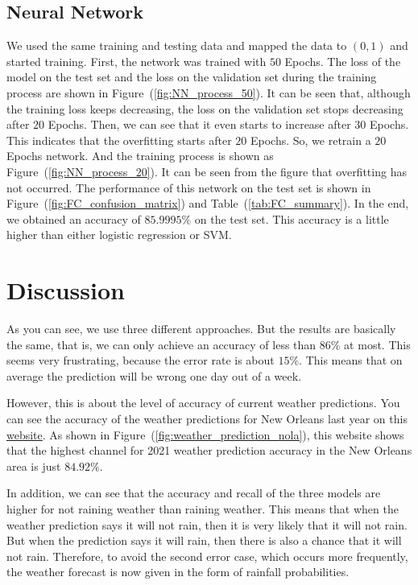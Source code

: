 \documentclass[11pt, a4paper, jou]{apa7}
\begin{document}
\subsection{Neural Network}
We used the same training and testing data and mapped the data to $(0,1)$ and started training. First, the network was trained with $50$ Epochs. The loss of the model on the test set and the loss on the validation set during the training process are shown in Figure~(\ref{fig:NN_process_50}). It can be seen that, although the training loss keeps decreasing, the loss on the validation set stops decreasing after $20$ Epochs. Then, we can see that it even starts to increase after $30$ Epochs. This indicates that the overfitting starts after $20$ Epochs. So, we retrain a $20$ Epochs network. And the training process is shown as Figure~(\ref{fig:NN_process_20}). It can be seen from the figure that overfitting has not occurred. The performance of this network on the test set is shown in Figure~(\ref{fig:FC_confusion_matrix}) and Table~(\ref{tab:FC_summary}). In the end, we obtained an accuracy of $85.9995\%$ on the test set. This accuracy is a little higher than either logistic regression or SVM. 

\section{Discussion}

As you can see, we use three different approaches. But the results are basically the same, that is, we can only achieve an accuracy of less than $86\%$ at most. This seems very frustrating, because the error rate is about $15\%$. This means that on average the prediction will be wrong one day out of a week. 

However, this is about the level of accuracy of current weather predictions. You can see the accuracy of the weather predictions for New Orleans last year on this \href{https://www.forecastadvisor.com/Louisiana/NewOrleans/70112/}{website}. As shown in Figure~(\ref{fig:weather_prediction_nola}), this website shows that the highest channel for 2021 weather prediction accuracy in the New Orleans area is just $84.92\%$. 

In addition, we can see that the accuracy and recall of the three models are higher for not raining weather than raining weather. This means that when the weather prediction says it will not rain, then it is very likely that it will not rain. But when the prediction says it will rain, then there is also a chance that it will not rain. Therefore, to avoid the second error case, which occurs more frequently, the weather forecast is now given in the form of rainfall probabilities. 
\end{document}
